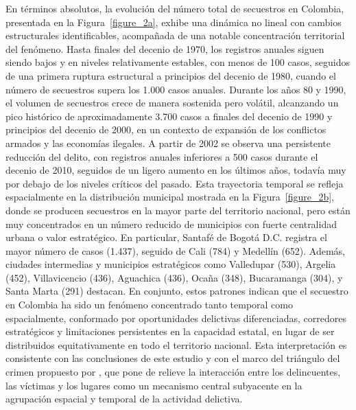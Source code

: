 \documentclass[12pt]{article}
\providecommand{\textcite}{\citet}
\theoremstyle{definition}
\theoremstyle{remark}
\newcommand{\1}{\mathbf{1}}
\begin{document}
En términos absolutos, la evolución del número total de secuestros en Colombia, presentada en la Figura~\ref{figure_2a}, exhibe una dinámica no lineal con cambios estructurales identificables, acompañada de una notable concentración territorial del fenómeno. Hasta finales del decenio de 1970, los registros anuales siguen siendo bajos y en niveles relativamente estables, con menos de 100 casos, seguidos de una primera ruptura estructural a principios del decenio de 1980, cuando el número de secuestros supera los 1.000 casos anuales. Durante los años 80 y 1990, el volumen de secuestros crece de manera sostenida pero volátil, alcanzando un pico histórico de aproximadamente 3.700 casos a finales del decenio de 1990 y principios del decenio de 2000, en un contexto de expansión de los conflictos armados y las economías ilegales. A partir de 2002 se observa una persistente reducción del delito, con registros anuales inferiores a 500 casos durante el decenio de 2010, seguidos de un ligero aumento en los últimos años, todavía muy por debajo de los niveles críticos del pasado. Esta trayectoria temporal se refleja espacialmente en la distribución municipal mostrada en la Figura~\ref{figure_2b}, donde se producen secuestros en la mayor parte del territorio nacional, pero están muy concentrados en un número reducido de municipios con fuerte centralidad urbana o valor estratégico. En particular, Santafé de Bogotá D.C. registra el mayor número de casos (1.437), seguido de Cali (784) y Medellín (652). Además, ciudades intermedias y municipios estratégicos como Valledupar (530), Argelia (452), Villavicencio (436), Aguachica (436), Ocaña (348), Bucaramanga (304), y Santa Marta (291) destacan. En conjunto, estos patrones indican que el secuestro en Colombia ha sido un fenómeno concentrado tanto temporal como espacialmente, conformado por oportunidades delictivas diferenciadas, corredores estratégicos y limitaciones persistentes en la capacidad estatal, en lugar de ser distribuidos equitativamente en todo el territorio nacional. Esta interpretación es consistente con las conclusiones de este estudio y con el marco del triángulo del crimen propuesto por \textcite{Pires2014}, que pone de relieve la interacción entre los delincuentes, las víctimas y los lugares como un mecanismo central subyacente en la agrupación espacial y temporal de la actividad delictiva.
\end{document}
